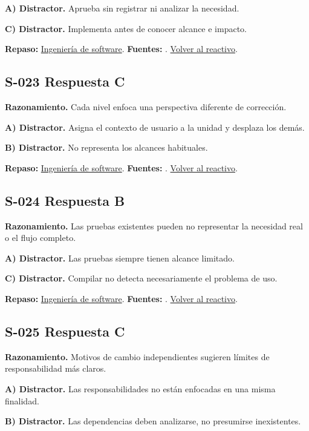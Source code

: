 \textbf{A) Distractor. }Aprueba sin registrar ni analizar la necesidad.

\textbf{C) Distractor. }Implementa antes de conocer alcance e impacto.

\textbf{Repaso:} \hyperref[sec:s1]{Ingeniería de software}. \textbf{Fuentes:} \cite{scrum,swebok}. \hyperref[q:S-022]{Volver al reactivo}.\par\medskip

\subsection*{S-023 \quad Respuesta C}\label{s:S-023}
\textbf{Razonamiento.} Cada nivel enfoca una perspectiva diferente de corrección.

\textbf{A) Distractor. }Asigna el contexto de usuario a la unidad y desplaza los demás.

\textbf{B) Distractor. }No representa los alcances habituales.

\textbf{Repaso:} \hyperref[sec:s1]{Ingeniería de software}. \textbf{Fuentes:} \cite{scrum,swebok}. \hyperref[q:S-023]{Volver al reactivo}.\par\medskip

\subsection*{S-024 \quad Respuesta B}\label{s:S-024}
\textbf{Razonamiento.} Las pruebas existentes pueden no representar la necesidad real o el flujo completo.

\textbf{A) Distractor. }Las pruebas siempre tienen alcance limitado.

\textbf{C) Distractor. }Compilar no detecta necesariamente el problema de uso.

\textbf{Repaso:} \hyperref[sec:s1]{Ingeniería de software}. \textbf{Fuentes:} \cite{scrum,swebok}. \hyperref[q:S-024]{Volver al reactivo}.\par\medskip

\subsection*{S-025 \quad Respuesta C}\label{s:S-025}
\textbf{Razonamiento.} Motivos de cambio independientes sugieren límites de responsabilidad más claros.

\textbf{A) Distractor. }Las responsabilidades no están enfocadas en una misma finalidad.

\textbf{B) Distractor. }Las dependencias deben analizarse, no presumirse inexistentes.

